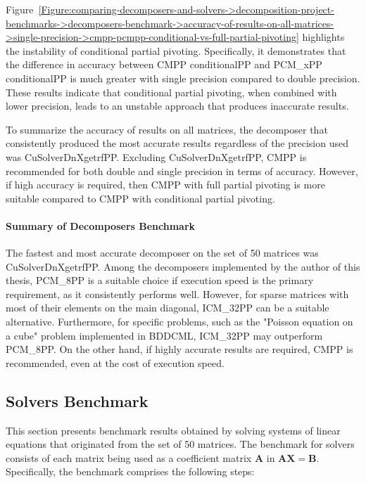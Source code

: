 Figure~\ref{Figure:comparing-decomposers-and-solvers->decomposition-project-benchmarks->decomposers-benchmark->accuracy-of-results-on-all-matrices->single-precision->cmpp-pcmpp-conditional-vs-full-partial-pivoting} highlights the instability of conditional partial pivoting.
Specifically, it demonstrates that the difference in accuracy between CMPP conditionalPP and PCM\_xPP conditionalPP is much greater with single precision compared to double precision.
These results indicate that conditional partial pivoting, when combined with lower precision, leads to an unstable approach that produces inaccurate results.

To summarize the accuracy of results on all matrices, the decomposer that consistently produced the most accurate results regardless of the precision used was CuSolverDnXgetrfPP.
Excluding CuSolverDnXgetrfPP, CMPP is recommended for both double and single precision in terms of accuracy.
However, if high accuracy is required, then CMPP with full partial pivoting is more suitable compared to CMPP with conditional partial pivoting.

\paragraph{Summary of Decomposers Benchmark} The fastest and most accurate decomposer on the set of 50 matrices was CuSolverDnXgetrfPP.
Among the decomposers implemented by the author of this thesis, PCM\_8PP is a suitable choice if execution speed is the primary requirement, as it consistently performs well.
However, for sparse matrices with most of their elements on the main diagonal, ICM\_32PP can be a suitable alternative.
Furthermore, for specific problems, such as the "Poisson equation on a cube" problem implemented in BDDCML, ICM\_32PP may outperform PCM\_8PP.
On the other hand, if highly accurate results are required, CMPP is recommended, even at the cost of execution speed.



\subsection{Solvers Benchmark}\label{Subsection:comparing-decomposers-and-solvers->decomposition-project-benchmarks->solvers-benchmark}
This section presents benchmark results obtained by solving systems of linear equations that originated from the set of 50 matrices.
The benchmark for solvers consists of each matrix being used as a coefficient matrix $\mathbf{A}$ in $\mathbf{AX} = \mathbf{B}$.
Specifically, the benchmark comprises the following steps:

